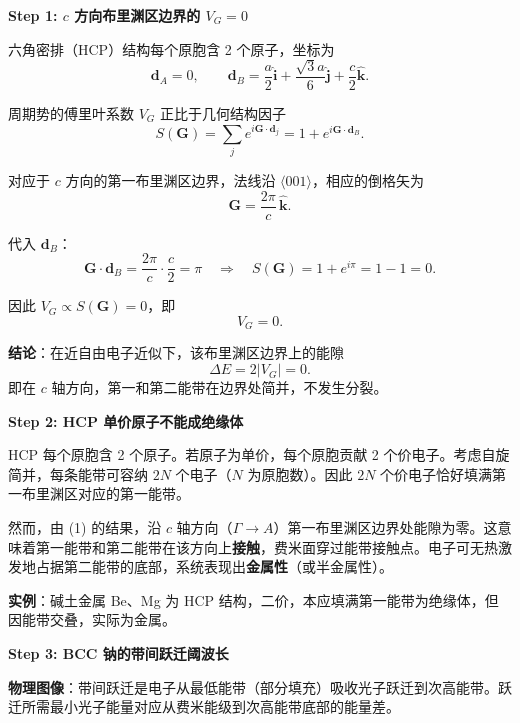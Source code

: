 \begin{derivationbox}[标准解题过程]
\textbf{Step 1: $c$ 方向布里渊区边界的 $V_G=0$}

六角密排（HCP）结构每个原胞含 2 个原子，坐标为
\begin{equation}
\bm{d}_A=0,\qquad
\bm{d}_B=\frac{a}{2}\hat{\bm{i}}+\frac{\sqrt{3}a}{6}\hat{\bm{j}}+\frac{c}{2}\hat{\bm{k}}.
\end{equation}

周期势的傅里叶系数 $V_G$ 正比于几何结构因子
\begin{equation}
S(\bm{G})=\sum_j e^{i\bm{G}\cdot\bm{d}_j}=1+e^{i\bm{G}\cdot\bm{d}_B}.
\end{equation}

对应于 $c$ 方向的第一布里渊区边界，法线沿 $\langle001\rangle$，相应的倒格矢为
\begin{equation}
\bm{G}=\frac{2\pi}{c}\,\hat{\bm{k}}.
\end{equation}

代入 $\bm{d}_B$：
\begin{equation}
\bm{G}\cdot\bm{d}_B=\frac{2\pi}{c}\cdot\frac{c}{2}=\pi
\quad\Longrightarrow\quad
S(\bm{G})=1+e^{i\pi}=1-1=0.
\end{equation}

因此 $V_G\propto S(\bm{G})=0$，即
\begin{equation}
\boxed{V_G=0.}
\end{equation}

\textbf{结论}：在近自由电子近似下，该布里渊区边界上的能隙
\begin{equation}
\Delta E=2|V_G|=0.
\end{equation}
即在 $c$ 轴方向，第一和第二能带在边界处简并，不发生分裂。

\textbf{Step 2: HCP 单价原子不能成绝缘体}

HCP 每个原胞含 2 个原子。若原子为单价，每个原胞贡献 2 个价电子。考虑自旋简并，每条能带可容纳 $2N$ 个电子（$N$ 为原胞数）。因此 $2N$ 个价电子恰好填满第一布里渊区对应的第一能带。

然而，由 (1) 的结果，沿 $c$ 轴方向（$\Gamma\to A$）第一布里渊区边界处能隙为零。这意味着第一能带和第二能带在该方向上\textbf{接触}，费米面穿过能带接触点。电子可无热激发地占据第二能带的底部，系统表现出\textbf{金属性}（或半金属性）。

\textbf{实例}：碱土金属 Be、Mg 为 HCP 结构，二价，本应填满第一能带为绝缘体，但因能带交叠，实际为金属。

\textbf{Step 3: BCC 钠的带间跃迁阈波长}

\textbf{物理图像}：带间跃迁是电子从最低能带（部分填充）吸收光子跃迁到次高能带。跃迁所需最小光子能量对应从费米能级到次高能带底部的能量差。


\end{derivationbox}
